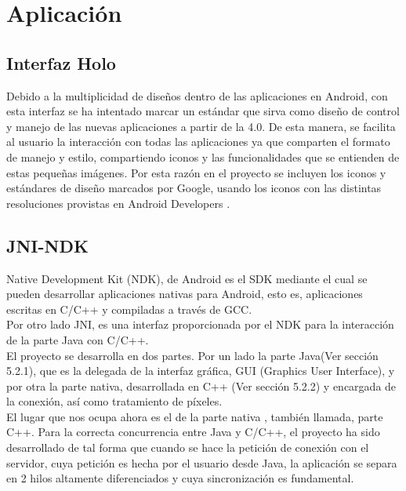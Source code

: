\section{Aplicación}

\subsection{Interfaz Holo}

Debido a la multiplicidad de diseños dentro de las aplicaciones en Android, con esta interfaz se ha intentado marcar un estándar que sirva como diseño de control y manejo de las nuevas aplicaciones a partir de la 4.0. De esta manera, se facilita al usuario la interacción con todas las aplicaciones ya que comparten el formato de manejo y estilo, compartiendo iconos y las funcionalidades que se entienden de estas pequeñas imágenes. Por esta razón en el proyecto se incluyen los iconos y estándares de diseño marcados por Google, usando los iconos con las distintas resoluciones provistas en Android Developers \cite{holo:holo}.

\subsection{JNI-NDK}
Native Development Kit (NDK), de Android es el SDK mediante el cual se pueden desarrollar aplicaciones nativas para Android, esto es, aplicaciones escritas en C/C++ y compiladas a través de GCC.\\

Por otro lado JNI, es una interfaz proporcionada por el NDK para la interacción de la parte Java con C/C++.\\

El proyecto se desarrolla en dos partes. Por un lado la parte Java(Ver sección 5.2.1), que es la delegada de la interfaz gráfica, GUI (Graphics User Interface), y por otra la parte nativa, desarrollada en C++ (Ver sección 5.2.2) y encargada de la conexión, así como tratamiento de píxeles.\\

El lugar que nos ocupa ahora es el de la parte nativa , también llamada, parte C++. Para la correcta concurrencia entre Java y C/C++, el proyecto ha sido desarrollado de tal forma que cuando se hace la petición de conexión con el servidor, cuya petición es hecha por el usuario desde Java, la aplicación se separa en 2 hilos altamente diferenciados y cuya sincronización es fundamental.\\

